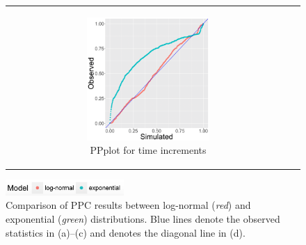 \documentclass[ba]{imsart}
\numberwithin{equation}{section}
\theoremstyle{plain}
\begin{document}
\begin{figure}[H]
\begin{tabular}[t]{cc}
\begin{subfigure}[b]{0.495\textwidth}
				\end{subfigure}
				\begin{subfigure}[b]{0.495\textwidth}
					\centering
					\caption{PPplot for time increments}
					\includegraphics[width=0.56\textwidth]{img/timePPplot2-1.png}
				\end{subfigure}
			\end{tabular}
			\includegraphics[width=0.4\textwidth]{img/modellabel.png}
			\caption {Comparison of PPC results between log-normal (\textit{red}) and exponential (\textit{green}) distributions. Blue lines denote the observed statistics in (a)--(c) and denotes the diagonal line in (d).}
			\label{figure:PPCtwo}
		\end{figure}
		\newpage
\end{document}
